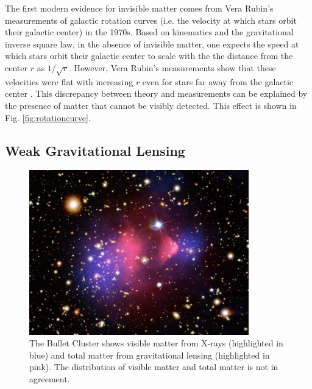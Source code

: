 The first modern evidence for invisible matter comes from Vera Rubin's measurements of galactic rotation curves (i.e. the velocity at which stars orbit their galactic center) in the 1970s. Based on kinematics and the gravitational inverse square law, in the absence of invisible matter, one expects the speed at which stars orbit their galactic center to scale with the the distance from the center $r$ as $1/\sqrt{r}$. However, Vera Rubin's measurements show that these velocities were flat with increasing $r$ even for stars far away from the galactic center \cite{Rubin:1980zd}. This discrepancy between theory and measurements can be explained by the presence of matter that cannot be visibly detected. This effect is shown in Fig. \ref{fig:rotationcurve}.

\clearpage

\subsection{Weak Gravitational Lensing}\label{sec:gravitationallensing}

\begin{figure}
    \centering
    \includegraphics[width=0.85\textwidth]{figs/motivation/bulletcluster.jpg}
    \caption{The Bullet Cluster shows visible matter from X-rays (highlighted in blue) and total matter from gravitational lensing (highlighted in pink). The distribution of visible matter and total matter is not in agreement.}
    \label{fig:lensing}
\end{figure}

